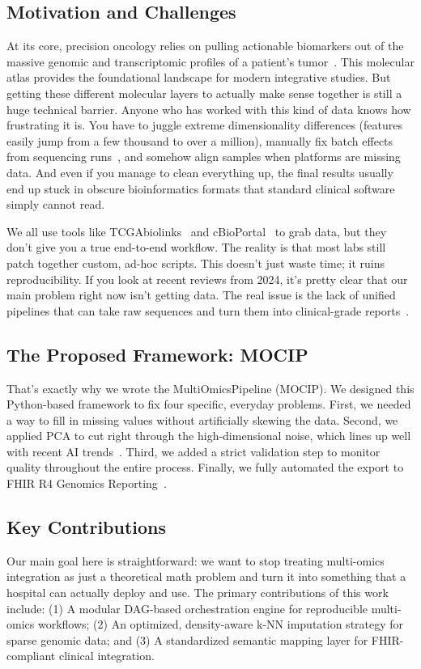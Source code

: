 \documentclass[runningheads]{llncs}
\begin{document}
\subsection{Motivation and Challenges}
At its core, precision oncology relies on pulling actionable biomarkers out of the massive genomic and transcriptomic profiles of a patient's tumor~\cite{tomczak2015}. This molecular atlas provides the foundational landscape for modern integrative studies. But getting these different molecular layers to actually make sense together is still a huge technical barrier. Anyone who has worked with this kind of data knows how frustrating it is. You have to juggle extreme dimensionality differences (features easily jump from a few thousand to over a million), manually fix batch effects from sequencing runs~\cite{leek2010}, and somehow align samples when platforms are missing data. And even if you manage to clean everything up, the final results usually end up stuck in obscure bioinformatics formats that standard clinical software simply cannot read.

We all use tools like TCGAbiolinks~\cite{colaprico2016} and cBioPortal~\cite{cerami2012} to grab data, but they don't give you a true end-to-end workflow. The reality is that most labs still patch together custom, ad-hoc scripts. This doesn't just waste time; it ruins reproducibility. If you look at recent reviews from 2024, it's pretty clear that our main problem right now isn't getting data. The real issue is the lack of unified pipelines that can take raw sequences and turn them into clinical-grade reports~\cite{abdelaziz2024multi,hernandez2024methods}.

\subsection{The Proposed Framework: MOCIP}
That's exactly why we wrote the MultiOmicsPipeline (MOCIP). We designed this Python-based framework to fix four specific, everyday problems. First, we needed a way to fill in missing values without artificially skewing the data. Second, we applied PCA to cut right through the high-dimensional noise, which lines up well with recent AI trends~\cite{nam2024harnessing}. Third, we added a strict validation step to monitor quality throughout the entire process. Finally, we fully automated the export to FHIR R4 Genomics Reporting~\cite{mandel2016}. 

\subsection{Key Contributions}
Our main goal here is straightforward: we want to stop treating multi-omics integration as just a theoretical math problem and turn it into something that a hospital can actually deploy and use. The primary contributions of this work include: (1) A modular DAG-based orchestration engine for reproducible multi-omics workflows; (2) An optimized, density-aware k-NN imputation strategy for sparse genomic data; and (3) A standardized semantic mapping layer for FHIR-compliant clinical integration.
\end{document}
